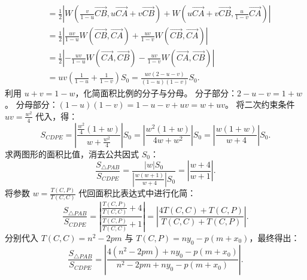 \begin{solution}
\begin{align*}
&= \frac{1}{2} \left| W\left(\frac{v}{1-u}\overrightarrow{CB}, u\overrightarrow{CA} + v\overrightarrow{CB}\right) + W\left(u\overrightarrow{CA} + v\overrightarrow{CB}, \frac{u}{1-v}\overrightarrow{CA}\right) \right| \\
&= \frac{1}{2} \left| \frac{uv}{1-u} W(\overrightarrow{CB}, \overrightarrow{CA}) + \frac{uv}{1-v} W(\overrightarrow{CB}, \overrightarrow{CA}) \right| \\
&= \frac{1}{2} \left| -\frac{uv}{1-u} W(\overrightarrow{CA}, \overrightarrow{CB}) - \frac{uv}{1-v} W(\overrightarrow{CA}, \overrightarrow{CB}) \right| \\
&= uv \left( \frac{1}{1-u} + \frac{1}{1-v} \right) S_0 = \frac{uv(2-u-v)}{(1-u)(1-v)} S_0.
\end{align*}
利用 $u+v = 1-w$，化简面积比例的分子与分母。
分子部分：$2-u-v = 1+w$。
分母部分：$(1-u)(1-v) = 1 - u - v + uv = w + uv$。
将二次约束条件 $uv = \frac{w^2}{4}$ 代入，得：
\[ S_{CDPE} = \left| \frac{\frac{w^2}{4}(1+w)}{w + \frac{w^2}{4}} \right| S_0 = \left| \frac{w^2(1+w)}{4w + w^2} \right| S_0 = \left| \frac{w(1+w)}{w+4} \right| S_0. \]
求两图形的面积比值，消去公共因式 $S_0$：
\[ \frac{S_{\triangle PAB}}{S_{CDPE}} = \frac{|w| S_0}{\left| \frac{w(w+1)}{w+4} \right| S_0} = \left| \frac{w+4}{w+1} \right|. \]
将参数 $w = \frac{T(C,P)}{T(C,C)}$ 代回面积比表达式中进行化简：
\[ \frac{S_{\triangle PAB}}{S_{CDPE}} = \left| \frac{\frac{T(C,P)}{T(C,C)} + 4}{\frac{T(C,P)}{T(C,C)} + 1} \right| = \left| \frac{4T(C,C) + T(C,P)}{T(C,C) + T(C,P)} \right|. \]
分别代入 $T(C,C) = n^2 - 2pm$ 与 $T(C,P) = ny_0 - p(m + x_0)$，最终得出：
\[ \frac{S_{\triangle PAB}}{S_{CDPE}} = \left| \frac{4(n^2 - 2pm) + ny_0 - p(m + x_0)}{n^2 - 2pm + ny_0 - p(m + x_0)} \right|. \]

\end{solution}


